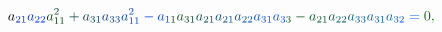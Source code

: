 \documentclass[12pt]{article}
\begin{document}
\begin{displaymath}
{a} _ { \mathcolor[RGB]{0,45,195}{2} \mathcolor[RGB]{0,45,210}{1} } \mathcolor[RGB]{0,45,225}{a} _ { \mathcolor[RGB]{0,45,240}{2} \mathcolor[RGB]{0,45,255}{2} } \mathcolor[RGB]{0,60,0}{a} _ { \mathcolor[RGB]{0,60,15}{1} \mathcolor[RGB]{0,60,30}{1} } ^ { \mathcolor[RGB]{0,60,45}{2} } \mathcolor[RGB]{0,60,60}{+} \mathcolor[RGB]{0,60,75}{a} _ { \mathcolor[RGB]{0,60,90}{3} \mathcolor[RGB]{0,60,105}{1} } \mathcolor[RGB]{0,60,120}{a} _ { \mathcolor[RGB]{0,60,135}{3} \mathcolor[RGB]{0,60,150}{3} } \mathcolor[RGB]{0,60,165}{a} _ { \mathcolor[RGB]{0,60,180}{1} \mathcolor[RGB]{0,60,195}{1} } ^ { \mathcolor[RGB]{0,60,210}{2} } \mathcolor[RGB]{0,60,225}{-} \mathcolor[RGB]{0,60,240}{a} _ { \mathcolor[RGB]{0,60,255}{1} \mathcolor[RGB]{0,75,0}{1} } \mathcolor[RGB]{0,75,15}{a} _ { \mathcolor[RGB]{0,75,30}{3} \mathcolor[RGB]{0,75,45}{1} } \mathcolor[RGB]{0,75,60}{a} _ { \mathcolor[RGB]{0,75,75}{2} \mathcolor[RGB]{0,75,90}{1} } \mathcolor[RGB]{0,75,105}{a} _ { \mathcolor[RGB]{0,75,120}{2} \mathcolor[RGB]{0,75,135}{1} } \mathcolor[RGB]{0,75,150}{a} _ { \mathcolor[RGB]{0,75,165}{2} \mathcolor[RGB]{0,75,180}{2} } \mathcolor[RGB]{0,75,195}{a} _ { \mathcolor[RGB]{0,75,210}{3} \mathcolor[RGB]{0,75,225}{1} } \mathcolor[RGB]{0,75,240}{a} _ { \mathcolor[RGB]{0,75,255}{3} \mathcolor[RGB]{0,90,0}{3} } \mathcolor[RGB]{0,90,15}{-} \mathcolor[RGB]{0,90,30}{a} _ { \mathcolor[RGB]{0,90,45}{2} \mathcolor[RGB]{0,90,60}{1} } \mathcolor[RGB]{0,90,75}{a} _ { \mathcolor[RGB]{0,90,90}{2} \mathcolor[RGB]{0,90,105}{2} } \mathcolor[RGB]{0,90,120}{a} _ { \mathcolor[RGB]{0,90,135}{3} \mathcolor[RGB]{0,90,150}{3} } \mathcolor[RGB]{0,90,165}{a} _ { \mathcolor[RGB]{0,90,180}{3} \mathcolor[RGB]{0,90,195}{1} } \mathcolor[RGB]{0,90,210}{a} _ { \mathcolor[RGB]{0,90,225}{3} \mathcolor[RGB]{0,90,240}{2} } \mathcolor[RGB]{0,90,255}{=} \mathcolor[RGB]{0,105,0}{0} \mathcolor[RGB]{0,105,15}{,} \mathcolor[RGB]{0,105,30}{\,
}
\end{displaymath}
\end{document}
